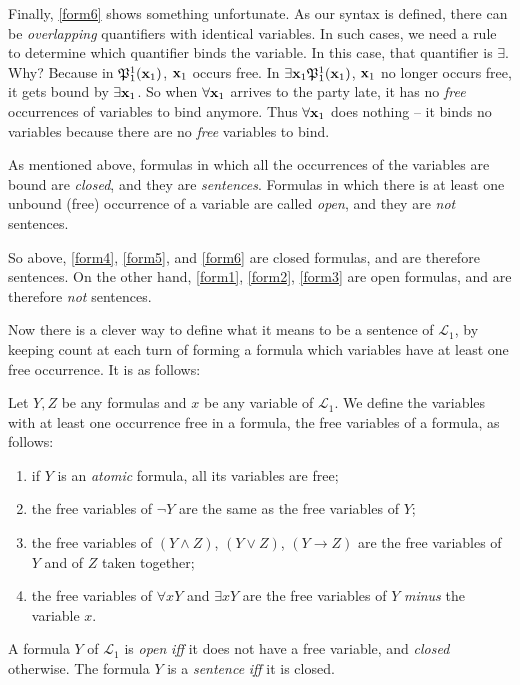 Finally, \ref{form6} shows something unfortunate. As our syntax is defined, there can be \textit{overlapping} quantifiers with identical variables. In such cases, we need a rule to determine which quantifier binds the variable. In this case, that quantifier is $\exists$. Why? Because in $\mathfrak{P}^{1}_{1}(\mathbf{x}_{1})$, $\mathbf{x}_{1}$ occurs free. In $\exists \mathbf{x}_{1} \mathfrak{P}^{1}_{1}(\mathbf{x}_{1})$, $\mathbf{x}_{1}$ no longer occurs free, it gets bound by $\exists \mathbf{x}_{1}$. So when $\forall \mathbf{x}_{1}$ arrives to the party late, it has no \textit{free} occurrences of variables to bind anymore. Thus $\forall \mathbf{x}_{1}$ does nothing -- it binds no variables because there are no \textit{free} variables to bind. 

As mentioned above, formulas in which all the occurrences of the variables are bound are \textit{closed}, and they are \textit{sentences}. Formulas in which there is at least one unbound (free) occurrence of a variable are called \textit{open}, and they are \textit{not} sentences. 

So above, \ref{form4}, \ref{form5}, and \ref{form6} are closed formulas, and are therefore sentences. On the other hand, \ref{form1}, \ref{form2}, \ref{form3} are open formulas, and are therefore \textit{not} sentences. 

Now there is a clever way to define what it means to be a sentence of $\mathcal{L}_1$, by keeping count at each turn of forming a formula which variables have at least one free occurrence. It is as follows:

\begin{defn}[Sentences]
Let $Y, Z$ be any formulas and $x$ be any variable of $\mathcal{L}_1$. We define the variables with at least one occurrence free in a formula, the free variables of a formula, as follows: 
\begin{enumerate}
	\item if $Y$ is an \textit{atomic} formula, all its variables are free;
	\item the free variables of $\neg Y$ are the same as the free variables of $Y$;
	\item the free variables of $(Y \wedge Z)$, $(Y \vee Z)$, $(Y \rightarrow Z)$ are the free variables of $Y$ and of $Z$ taken together;
	\item the free variables of $\forall x Y$ and $\exists x Y$ are the free variables of $Y$ \textit{minus} the variable $x$.
\end{enumerate}

A formula $Y$ of $\mathcal{L}_1$ is \textit{open} \textit{iff} it does not have a free variable, and \textit{closed} otherwise. The formula $Y$ is a \textit{sentence} \textit{iff} it is closed. 
\end{defn}

